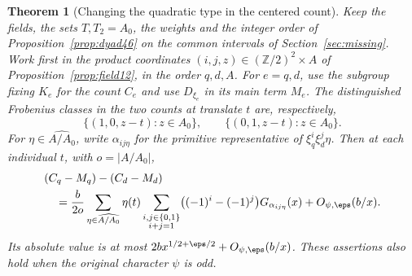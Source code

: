\documentclass[a4paper,11pt]{article}
\newtheorem{theorem}[proposition]{Theorem}
\theoremstyle{definition}
\theoremstyle{remark}
\newcommand{\ZZ}{\mathbb Z}\newcommand{\ord}{\operatorname{ord}}
\numberwithin{equation}{section}
\begin{document}
\begin{theorem}[Changing the quadratic type in the centered count]\label{thm:orientation46}
Keep the fields, the sets \(T,T_2=A_0\), the weights and the integer
order of Proposition~\ref{prop:dyad46} on the common intervals of
Section~\ref{sec:missing}. Work first in the product coordinates
\((i,j,z)\in(\ZZ/2)^2\times A\) of Proposition~\ref{prop:field12}, in
the order \(q,d,A\). For \(e=q,d\), use the subgroup fixing \(K_e\)
for the count \(C_e\) and use \(D_{\xi_e}\) in its main term \(M_e\).
The distinguished Frobenius classes in the two counts at translate \(t\)
are, respectively,
\[
  \{(1,0,z-t):z\in A_0\},\qquad \{(0,1,z-t):z\in A_0\}.
\]
For \(\eta\in\widehat{A/A_0}\), write \(\alpha_{ij\eta}\) for the
primitive representative of \(\xi_q^i\xi_d^j\eta\). Then at each
individual \(t\), with \(o=|A/A_0|\),
\begin{align}
 &(C_q-M_q)-(C_d-M_d) \notag\\
 &\quad=\frac{b}{2o}\sum_{\eta\in\widehat{A/A_0}}\eta(t)
       \sum_{\substack{i,j\in\{0,1\}\\i+j=1}}
       \bigl((-1)^i-(-1)^j\bigr)G_{\alpha_{ij\eta}}(x)
       +O_{\psi,\eps}(b/x).                                      \label{eq:change46}
\end{align}
Its absolute value is at most \(2b x^{1/2+\eps/2}+O_{\psi,\eps}(b/x)\).
These assertions also hold when the original character \(\psi\) is odd.
\end{theorem}
\end{document}

